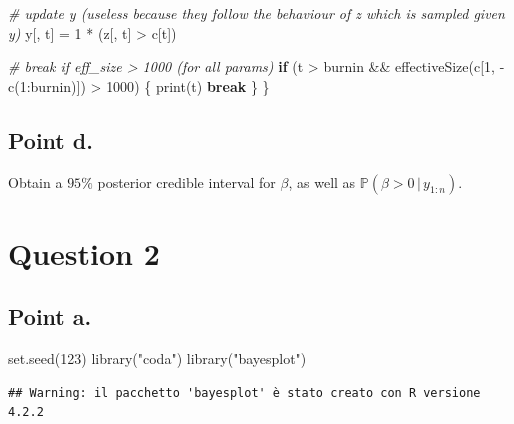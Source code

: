 \documentclass[
  11pt,
]{article}
\newenvironment{Shaded}{\begin{snugshade}}{\end{snugshade}}
\newcommand{\CommentTok}[1]{\textcolor[rgb]{0.56,0.35,0.01}{\textit{#1}}}
\newcommand{\ControlFlowTok}[1]{\textcolor[rgb]{0.13,0.29,0.53}{\textbf{#1}}}
\newcommand{\DecValTok}[1]{\textcolor[rgb]{0.00,0.00,0.81}{#1}}
\newcommand{\FunctionTok}[1]{\textcolor[rgb]{0.00,0.00,0.00}{#1}}
\newcommand{\NormalTok}[1]{#1}
\newcommand{\OtherTok}[1]{\textcolor[rgb]{0.56,0.35,0.01}{#1}}
\newcommand{\SpecialCharTok}[1]{\textcolor[rgb]{0.00,0.00,0.00}{#1}}
\newcommand{\StringTok}[1]{\textcolor[rgb]{0.31,0.60,0.02}{#1}}
\begin{document}
\begin{Shaded}
\begin{Highlighting}[]
    \CommentTok{\# update y (useless because they follow the behaviour of z which is sampled given y)}
\NormalTok{    y[, t] }\OtherTok{=} \DecValTok{1} \SpecialCharTok{*}\NormalTok{ (z[, t] }\SpecialCharTok{\textgreater{}}\NormalTok{ c[t])}

    \CommentTok{\# break if eff\_size \textgreater{} 1000 (for all params)}
    \ControlFlowTok{if}\NormalTok{ (t }\SpecialCharTok{\textgreater{}}\NormalTok{ burnin }\SpecialCharTok{\&\&} \FunctionTok{effectiveSize}\NormalTok{(c[}\DecValTok{1}\NormalTok{, }\SpecialCharTok{{-}}\FunctionTok{c}\NormalTok{(}\DecValTok{1}\SpecialCharTok{:}\NormalTok{burnin)]) }\SpecialCharTok{\textgreater{}} \DecValTok{1000}\NormalTok{) \{ }
        \FunctionTok{print}\NormalTok{(t)}
        \ControlFlowTok{break}
\NormalTok{    \}}
\NormalTok{\}}
\end{Highlighting}
\end{Shaded}

\normalsize

\hypertarget{point-d.}{%
\subsection{Point d.}\label{point-d.}}

Obtain a \(95\%\) posterior credible interval for \(\beta\), as well as
\(\mathbb{P}\left(\beta > 0 \,|\,y_{1:n}\right)\).

\hypertarget{question-2}{%
\section{Question 2}\label{question-2}}

\hypertarget{point-a.-1}{%
\subsection{Point a.}\label{point-a.-1}}

\scriptsize

\begin{Shaded}
\begin{Highlighting}[]
\FunctionTok{set.seed}\NormalTok{(}\DecValTok{123}\NormalTok{)}
\FunctionTok{library}\NormalTok{(}\StringTok{"coda"}\NormalTok{)}
\FunctionTok{library}\NormalTok{(}\StringTok{"bayesplot"}\NormalTok{)}
\end{Highlighting}
\end{Shaded}

\begin{verbatim}
## Warning: il pacchetto 'bayesplot' è stato creato con R versione 4.2.2
\end{verbatim}
\end{document}
